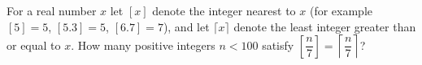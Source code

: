 For a real number $x$ let $[x]$ denote the integer nearest to $x$ (for example $[5]=5$, $[5.3]=5$, $[6.7]=7$), and let $\lceil x\rceil$ denote the least integer greater than or equal to $x$. How many positive integers $n<100$ satisfy $\left[\dfrac {n}{7}\right]=\left\lceil\dfrac {n}{7}\right\rceil$?

